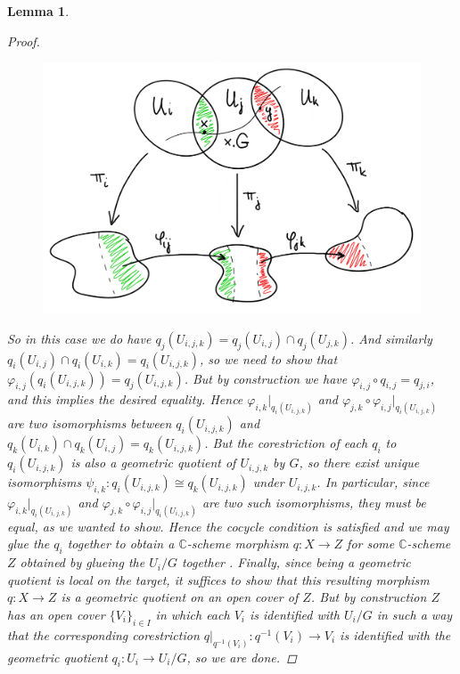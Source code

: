 \documentclass[12pt,a4paper]{amsart}
\theoremstyle{plain}
\newtheorem{lm}[thm]{Lemma}
\theoremstyle{definition}
\theoremstyle{remark}
\begin{document}
\begin{lm}
\begin{proof}
    \begin{figure}[H]
      \centering
      \includegraphics[scale=.9]{pictures/glueing.png}
    \end{figure}

    So in this case we do have $q_{j}(U_{i,j,k}) = q_{j}(U_{i,j}) \cap q_{j}(U_{j,k})$.
    And similarly $q_{i}(U_{i,j}) \cap q_{i}(U_{i,k}) = q_{i}(U_{i,j,k})$, so we need to show that $\varphi_{i,j}(q_{i}(U_{i,j,k})) = q_{j}(U_{i,j,k})$.
    But by construction we have $\varphi_{i,j} \circ q_{i,j} = q_{j,i}$, and this implies the desired equality.
    Hence $\varphi_{i,k}|_{q_{i}(U_{i,j,k})}$ and $\varphi_{j,k} \circ \varphi_{i,j}|_{q_{i}(U_{i,j,k})}$ are two isomorphisms between $q_{i}(U_{i,j,k})$ and $q_{k}(U_{i,k}) \cap q_{k}(U_{i,j}) = q_{k}(U_{i,j,k})$.
    But the corestriction of each $q_{i}$ to $q_{i}(U_{i,j,k})$ is also a geometric quotient of $U_{i,j,k}$ by $G$, so there exist unique isomorphisms $\psi_{i,k} \colon q_{i}(U_{i,j,k}) \cong q_{k}(U_{i,j,k})$ under $U_{i,j,k}$.
    In particular, since $\varphi_{i,k}|_{q_{i}(U_{i,j,k})}$ and $\varphi_{j,k} \circ \varphi_{i,j}|_{q_{i}(U_{i,j,k})}$ are two such isomorphisms, they must be equal, as we wanted to show.
    Hence the cocycle condition is satisfied and we may glue the $q_{i}$ together to obtain a $\mathbb{C}$-scheme morphism $q \colon X \to Z$ for some $\mathbb{C}$-scheme $Z$ obtained by glueing the $U_{i}/G$ together \cite[Exercise II.2.12]{har77}.
    Finally, since being a geometric quotient is local on the target, it suffices to show that this resulting morphism $q \colon X \to Z$ is a geometric quotient on an open cover of $Z$.
    But by construction $Z$ has an open cover $\{ V_{i} \}_{i \in I}$ in which each $V_{i}$ is identified with $U_{i}/G$ in such a way that the corresponding corestriction $q|_{q^{-1}(V_{i})} \colon q^{-1}(V_{i}) \to V_{i}$ is identified with the geometric quotient $q_{i} \colon U_{i} \to U_{i}/G$, so we are done.
  \end{proof}
\end{lm}
\end{document}
